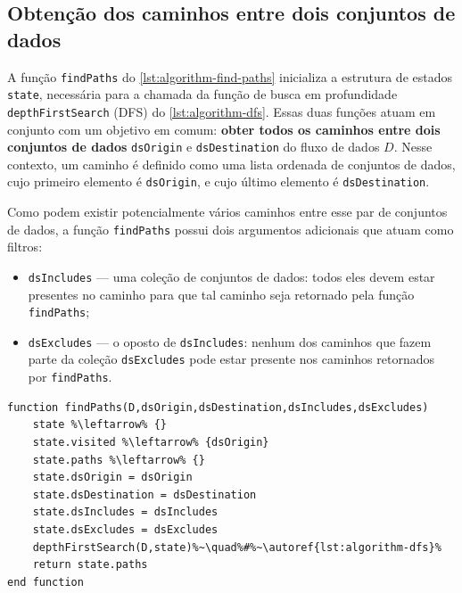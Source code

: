 \subsection{Obtenção dos caminhos entre dois conjuntos de dados}

A função \texttt{findPaths} do \autoref{lst:algorithm-find-paths} inicializa a estrutura de estados \texttt{state}, necessária para a chamada da função de busca em profundidade  \texttt{depthFirstSearch} (DFS) do \autoref{lst:algorithm-dfs}. Essas duas funções atuam em conjunto com um objetivo em comum: \textbf{obter todos os caminhos entre dois conjuntos de dados} \texttt{dsOrigin} e \texttt{dsDestination} do fluxo de dados \(D\).
Nesse contexto, um caminho é definido como uma lista ordenada de conjuntos de dados, cujo primeiro elemento é \texttt{dsOrigin}, e cujo último elemento é \texttt{dsDestination}.

Como podem existir potencialmente vários caminhos entre esse par de conjuntos de dados, a função \texttt{findPaths} possui dois argumentos adicionais que atuam como filtros:

\begin{itemize}
    \item \texttt{dsIncludes} --- uma coleção de conjuntos de dados: todos eles devem estar presentes no caminho para que tal caminho seja retornado pela função \texttt{findPaths};
    \item \texttt{dsExcludes} --- o oposto de \texttt{dsIncludes}: nenhum dos caminhos que fazem parte da coleção \texttt{dsExcludes} pode estar presente nos caminhos retornados por \texttt{findPaths}.
\end{itemize}

\begin{minipage}[c]{0.95\textwidth}
\begin{lstlisting}[language=pseudocode,label={lst:algorithm-find-paths},caption={[Obtenção dos caminhos entre dois conjuntos de dados]Obtenção de todos os caminhos entre dois conjuntos de dados, inicializando a \textsc{DFS} com um estado inicial apropriado.}]
function findPaths(D,dsOrigin,dsDestination,dsIncludes,dsExcludes)
    state %\leftarrow% {}
    state.visited %\leftarrow% {dsOrigin}
    state.paths %\leftarrow% {}
    state.dsOrigin = dsOrigin
    state.dsDestination = dsDestination
    state.dsIncludes = dsIncludes
    state.dsExcludes = dsExcludes
    depthFirstSearch(D,state)%~\quad%#%~\autoref{lst:algorithm-dfs}%
    return state.paths
end function
\end{lstlisting}
\end{minipage}

